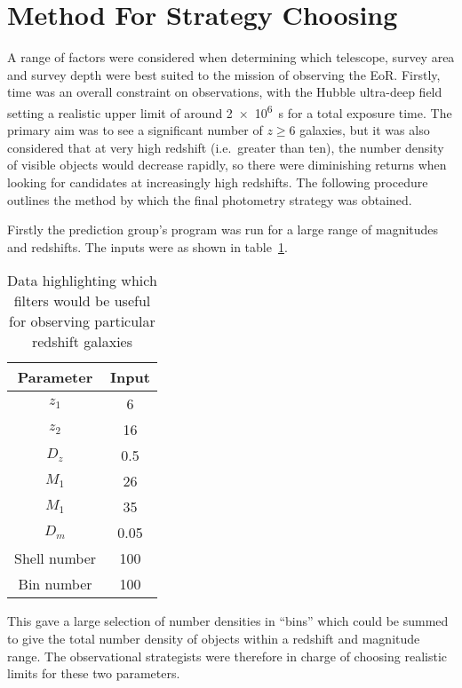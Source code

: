 
\section{Method For Strategy Choosing} %
\label{sec:method_for_strategy_choosing}
	A range of factors were considered when determining which telescope, survey area and survey depth were best suited to the mission of observing the EoR. Firstly, time was an overall constraint on observations, with the Hubble ultra-deep field setting a realistic upper limit of around \SI{2e6}{\second} for a total exposure time. The primary aim was to see a significant number of $z\ge6$ galaxies, but it was also considered that at very high redshift (i.e.\ greater than ten), the number density of visible objects would decrease rapidly, so there were diminishing returns when looking for candidates at increasingly high redshifts. The following procedure outlines the method by which the final photometry strategy was obtained.

	Firstly the prediction group’s program was run for a large range of magnitudes and redshifts. The inputs were as shown in table~\ref{tab:program_inputs}.
	\begin{table}[ht]
		\begin{center}
			\begin{tabular}{c|c}
				Parameter 	& Input \\
				\hline \hline
				$z_1$ & 6 \\
				$z_2$ & 16 \\
				$D_z$ & 0.5 \\
				$M_1$ & 26 \\
				$M_1$ & 35 \\
				$D_m$ & 0.05 \\
				Shell number & 100 \\
				Bin number & 100
			\end{tabular}
		\end{center}
		\caption{Data highlighting which filters would be useful for observing particular redshift galaxies\cite{Galactic_Astronomy_Binney_Merrifield}\label{tab:program_inputs}}
	\end{table}

	This gave a large selection of number densities in ``bins'' which could be summed to give the total number density of objects within a redshift and magnitude range. The observational strategists were therefore in charge of choosing realistic limits for these two parameters.

